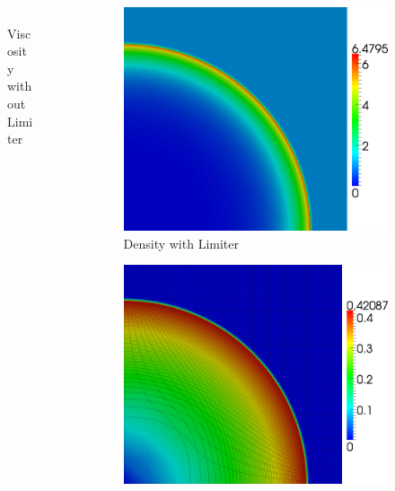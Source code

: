\documentclass[8pt,xcolor=svgnames]{beamer}
\begin{document}
\begin{frame}
\begin{columns}
\begin{column}{0.3\textwidth}
\begin{figure}[t]
\begin{center}
\\Viscosity without Limiter
\end{center}
\end{figure}
\end{column}
\begin{column}{0.3\textwidth}
\begin{figure}[t]
\begin{center}
\includegraphics[height=0.9\textwidth]{figs/Sedov/Q2l-80-density.png}
\\Density with Limiter
\end{center}
\end{figure}
\begin{figure}[t]
\begin{center}
\includegraphics[height=0.9\textwidth]{figs/Sedov/Q2l-80-velocity.png}

\end{center}
\end{figure}
\end{column}
\end{columns}
\end{frame}
\end{document}
